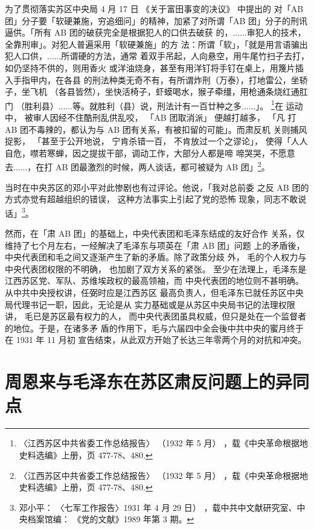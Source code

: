 为了贯彻落实苏区中央局 4 月 17 日
《关于富田事变的决议》
中提出的
对「AB 团」分子要「软硬兼施，穷追细问」的精神，加紧了对所谓「AB
团」分子的刑讯逼供。「所有 AB 团的破获完全是根据犯人的口供去破获
的，......审犯人的技术，全靠刑审」。对犯人普遍采用「软硬兼施」的方
法：所谓「软」，「就是用言语骗出犯人口供，......所谓硬的方法，通常
着双手吊起，人向悬空，用牛尾竹扫子去打，如仍坚持不供的，则用香火
或洋油烧身，甚至有用洋钉将手钉在桌上，用篾片插入手指甲内，在各县
的刑法种类无奇不有，有所谓炸刑（万泰），打地雷公，坐轿子，坐飞机
（各县皆然），坐快活椅子，虾蟆喝水，猴子牵缰，用枪通条烧红通肛门
（胜利县）......等。就胜利（县）说，刑法计有一百廿种之多......」。
\footnote{〈江西苏区中共省委工作总结报告〉
（1932 年 5 月）
，载《中央革命根据地史料选编》上册，页 477-78、480.}在
运动中，
被审人因经不住酷刑乱供乱咬， 「AB 团取消派」
便越打越多，
「凡
打 AB 团不毒辣的，都认为与 AB 团有关系，有被扣留的可能」。而肃反机
关则捕风捉影，
「甚至于公开地说，
宁肯杀错一百，
不肯放过一个之谬论」，
使得「人人自危，噤若寒蝉，因之提拔干部，调动工作，大部分人都是啼
啼哭哭，不愿意去......，在打 AB 团最激烈的时候，两人谈话，都可被疑为
AB 团」\footnote{〈江西苏区中共省委工作总结报告〉
（1932 年 5 月）
，载《中央革命根据地史料选编》上册，页 477-78、480.}。

当时在中央苏区的邓小平对此惨剧也有过评论。他说，「我对总前委
之反 AB 团的方式亦觉有超越组织的错误，
这种方法事实上引起了党的恐怖
现象，同志不敢说话」\footnote{ 邓小平：
〈七军工作报告〉1931 年 4 月 29 日）
，载中共中文献研究室、中央档案馆编：
《党的文献》1989 年第
3 期。}。

然而，在「肃 AB 团」的基础上，中央代表团和毛泽东结成的友好合作
关系，仅维持了七个月左右，一经解决了毛泽东与项英在「肃 AB 团」问题
上的矛盾後，中央代表团和毛之间又逐渐产生了新的矛盾。除了政策分歧
外，
毛的个人权力与中央代表团权限的不明确，
也加剧了双方关系的紧张。
至少在法理上，毛泽东是江西苏区党、军队、苏维埃政权的最高领袖，而
中央代表团的地位则不甚明确。从中共中央授权讲，任弼时应是江西苏区
最高负责人，但毛泽东已就任苏区中央局代理书记一职，因此，无论是从
实力基础或是从苏区中央局书记的法理权限讲，
毛已是苏区最有权力的人，
而中央代表团虽具权威，但只是处在一个监督者的地位。于是，在诸多矛
盾的作用下，毛与六届四中全会後中共中央的蜜月终于在 1931 年 11 月初
宣告结束，从此双方开始了长达三年零两个月的对抗和冲突。

\section{周恩来与毛泽东在苏区肃反问题上的异同点}

